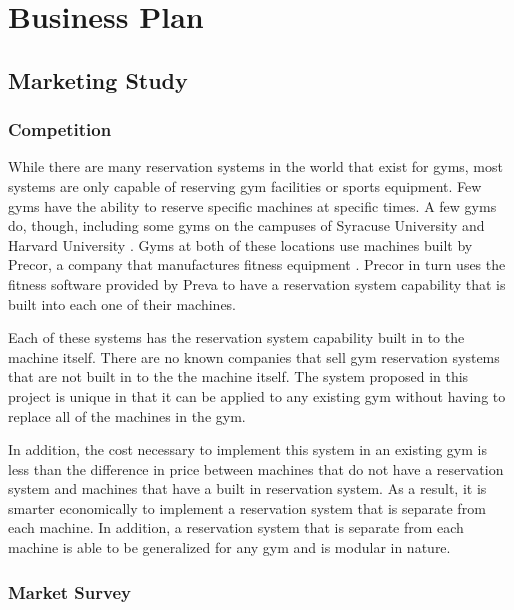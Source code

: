 \documentclass[PPFS.tex]{template/subfiles}
\begin{document}
\section{Business Plan}
    \subsection{Marketing Study}
        \subsubsection{Competition}
        
        While there are many reservation systems in the world that exist for gyms, most systems are only capable of reserving gym facilities or sports equipment. Few gyms have the ability to reserve specific machines at specific times. A few gyms do, though, including some gyms on the campuses of Syracuse University \cite{Syracuse} and Harvard University \cite{Harvard}. Gyms at both of these locations use machines built by Precor, a company that manufactures fitness equipment \cite{Precor}. Precor in turn uses the fitness software provided by Preva \cite{Preva} to have a reservation system capability that is built into each one of their machines.
        
        Each of these systems has the reservation system capability built in to the machine itself. There are no known companies that sell gym reservation systems that are not built in to the the machine itself. The system proposed in this project is unique in that it can be applied to any existing gym without having to replace all of the machines in the gym.
        
        In addition, the cost necessary to implement this system in an existing gym is less than the difference in price between machines that do not have a reservation system and machines that have a built in reservation system. As a result, it is smarter economically to implement a reservation system that is separate from each machine. In addition, a reservation system that is separate from each machine is able to be generalized for any gym and is modular in nature.%
        
        \subsubsection{Market Survey}
        
\end{document}
